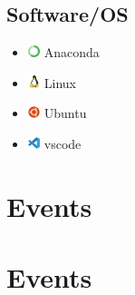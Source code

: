 \documentclass{article}
\begin{document}
\begin{multicols}{3}
\section*{Software/OS}
\begin{itemize}
    \item \includegraphics[height=10pt]{images/icons/anaconda-original.png} Anaconda
    \item \includegraphics[height=10pt]{images/icons/linux-original.png} Linux
    \item \includegraphics[height=10pt]{images/icons/ubuntu-plain.png} Ubuntu
    \item \includegraphics[height=10pt]{images/icons/vscode-original.png} vscode
\end{itemize}

\end{multicols}

\section*{Events}


\section*{Events}






\end{document}
